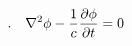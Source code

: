 \documentclass{article}
\begin{document}
\setcounter{equation}{0}
$$
.\quad\nabla^2 \phi -{1\over c} {\partial \phi\over \partial t}  = 0
$$
\end{document}
